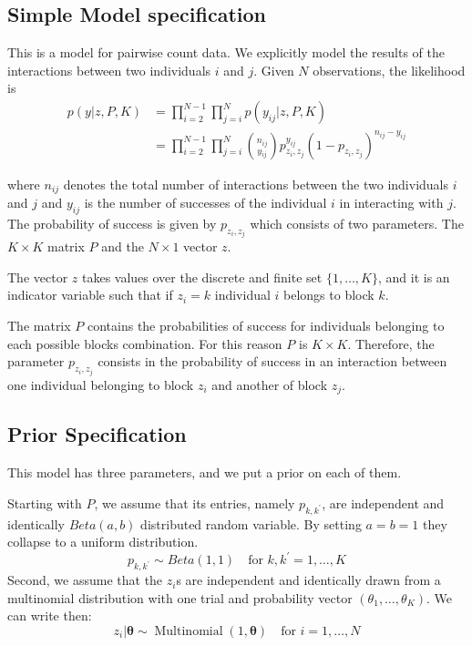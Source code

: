 \documentclass[11pt]{amsart}
\begin{document}
\subsection{Simple Model specification}
This is a model for pairwise count data. We explicitly model the results of the interactions between two individuals $i$ and $j$. Given $N$ observations, the likelihood is 
\begin{align}
p(y| z, P, K) &= \prod_{i =2 }^{N-1} \prod_{j =i}^{N} p(y_{ij} | z, P, K) \\ 
&= \prod_{i =2 }^{N-1} \prod_{j =i}^{N}  {n_{ij} \choose y_{ij}} p_{z_i, z_j}^{y_{ij}}(1- p_{z_i, z_j})^{n_{ij}-y_{ij}}
\end{align}

where $n_{ij}$ denotes the total number of interactions between the two individuals $i$ and $j$ and $y_{ij}$ is the number of successes of the individual $i$ in interacting with $j$. The probability of success is given by $p_{z_i, z_j}$ which consists of two parameters. The $K\times K$ matrix $P$ and the $N \times 1$ vector $z$.

The vector $z$ takes values over the discrete and finite set $\{ 1 , \ldots, K\}$, and it is an indicator variable such that if $z_i = k$ individual $i$ belongs to block $k$. 

The matrix $P$ contains the probabilities of success for individuals belonging to each possible blocks combination. For this reason $P$ is $K\times K$. Therefore, the parameter $p_{z_i, z_j}$ consists in the probability of success in an interaction between one individual belonging to block $z_i$ and another of block $z_j$. 

\subsection{Prior Specification}

This model has three parameters, and we put a prior on each of them.

Starting with $P$, we assume that its entries, namely $p_{k,k^\prime}$, are independent and identically $Beta(a,b)$ distributed random variable. By setting $a=b=1$ they collapse to a uniform distribution.
\begin{equation}
p_{k,k^\prime} \sim Beta(1,1) \quad \text{for } k,k^\prime = 1, \ldots,K
\end{equation}
Second, we assume that the $z_i$s are independent and identically drawn from a multinomial distribution with one trial and probability vector $(\theta_1, \dots, \theta_K)$. We can write then:
\begin{equation}
z_i| \boldsymbol{\theta} \sim \operatorname{Multinomial}(1,\boldsymbol{\theta}) \quad \text{for } i = 1, \ldots,N
\end{equation}
\end{document}
